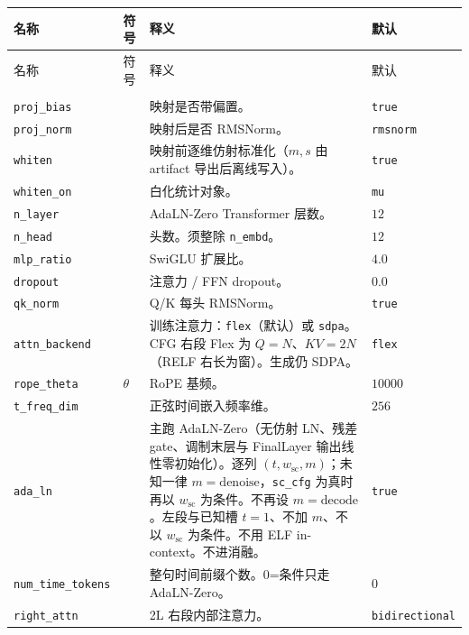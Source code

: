 \documentclass[UTF8,a4paper,11pt]{ctexart}
\begin{document}
{\small
\setlength{\tabcolsep}{4pt}
\begin{longtable}{@{}
  >{\raggedright\arraybackslash}p{}
  >{\centering\arraybackslash}p{}
  >{\raggedright\arraybackslash}p{}
  >{\raggedright\arraybackslash}p{}@{}}
\toprule
名称 & 符号 & 释义 & 默认 \\
\midrule
\endfirsthead
\toprule
名称 & 符号 & 释义 & 默认 \\
\midrule
\endhead
\bottomrule
\endlastfoot
\multicolumn{4}{@{}l}{\textit{模型}} \\
\texttt{proj\_bias} & & 映射是否带偏置。 & \texttt{true} \\
\texttt{proj\_norm} & & 映射后是否 RMSNorm。 & \texttt{rmsnorm} \\
\texttt{whiten} & & 映射前逐维仿射标准化（\(m,s\) 由 artifact 导出后离线写入）。 & \texttt{true} \\
\texttt{whiten\_on} & & 白化统计对象。 & \texttt{mu} \\
\texttt{n\_layer} & & AdaLN-Zero Transformer 层数。 & \(12\) \\
\texttt{n\_head} & & 头数。须整除 \texttt{n\_embd}。 & \(12\) \\
\texttt{mlp\_ratio} & & SwiGLU 扩展比。 & \(4.0\) \\
\texttt{dropout} & & 注意力 / FFN dropout。 & \(0.0\) \\
\texttt{qk\_norm} & & Q/K 每头 RMSNorm。 & \texttt{true} \\
\texttt{attn\_backend} & & 训练注意力：\texttt{flex}（默认）或 \texttt{sdpa}。CFG 右段 Flex 为 \(Q=N\)、\(KV=2N\)（RELF 右长为窗）。生成仍 SDPA。 & \texttt{flex} \\
\texttt{rope\_theta} & \(\theta\) & RoPE 基频。 & \(10000\) \\
\texttt{t\_freq\_dim} & & 正弦时间嵌入频率维。 & \(256\) \\
\texttt{ada\_ln} & & 主跑 AdaLN-Zero（无仿射 LN、残差 gate、调制末层与 FinalLayer 输出线性零初始化）。逐列 \((t,w_{\mathrm{sc}},m)\)；未知一律 \(m=\mathrm{denoise}\)，\texttt{sc\_cfg} 为真时再以 \(w_{\mathrm{sc}}\) 为条件。不再设 \(m=\mathrm{decode}\)。左段与已知槽 \(t=1\)、不加 \(m\)、不以 \(w_{\mathrm{sc}}\) 为条件。不用 ELF in-context。不进消融。 & \texttt{true} \\
\texttt{num\_time\_tokens} & & 整句时间前缀个数。0=条件只走 AdaLN-Zero。 & \(0\) \\
\texttt{right\_attn} & & 2L 右段内部注意力。 & \texttt{bidirectional} \\

\end{longtable}}
\end{document}
